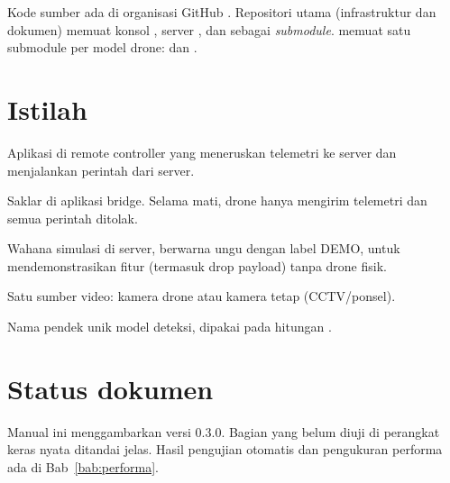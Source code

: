 Kode sumber ada di organisasi GitHub . Repositori utama  (infrastruktur dan dokumen) memuat konsol , server , dan  sebagai \emph{submodule}.  memuat satu submodule per model drone:  dan .

\section{Istilah}
\begin{description}[leftmargin=3.2cm,style=nextline]
\item[Bridge] Aplikasi di remote controller yang meneruskan telemetri ke server dan menjalankan perintah dari server.
\item[Interlock] Saklar  di aplikasi bridge. Selama mati, drone hanya mengirim telemetri dan semua perintah ditolak.
\item[Drone demo] Wahana simulasi di server, berwarna ungu dengan label DEMO, untuk mendemonstrasikan fitur (termasuk drop payload) tanpa drone fisik.
\item[Stream] Satu sumber video: kamera drone atau kamera tetap (CCTV/ponsel).
\item[Kunci model] Nama pendek unik model deteksi, dipakai pada hitungan .
\end{description}

\section{Status dokumen}
Manual ini menggambarkan versi 0.3.0. Bagian yang belum diuji di perangkat keras nyata ditandai jelas. Hasil pengujian otomatis dan pengukuran performa ada di Bab~\ref{bab:performa}.
